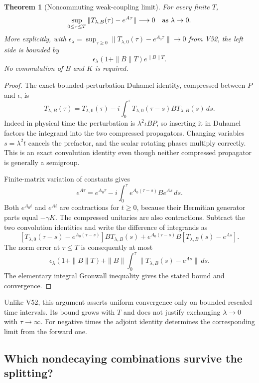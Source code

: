 \documentclass[11pt]{article}
\newtheorem{theorem}{Theorem}[section]
\theoremstyle{remark}
\begin{document}
\begin{theorem}[Noncommuting weak-coupling limit]
\label{thm:v20v53-limit}
For every finite \(T\),
\[
 \sup_{0\leq\tau\leq T}\|T_{\lambda,B}(\tau)-e^{A\tau}\|
       \longrightarrow0\quad\hbox{as }\lambda\to0.
\]
More explicitly, with
\(\epsilon_\lambda=\sup_{\tau\geq0}
 \|T_{\lambda,0}(\tau)-e^{A_0\tau}\|\to0\) from V52,
the left side is bounded by
\[
 \epsilon_\lambda(1+\|B\|T)e^{\|B\|T}.
\]
No commutation of \(B\) and \(K\) is required.
\end{theorem}
\begin{proof}
The exact bounded-perturbation Duhamel identity, compressed
between \(P\) and \(\iota\), is
\[
 T_{\lambda,B}(\tau)=T_{\lambda,0}(\tau)
 -i\int_0^\tau T_{\lambda,0}(\tau-s)B
                          T_{\lambda,B}(s)\,ds .
\]
Indeed in physical time the perturbation is
\(\lambda^2\iota BP\), so inserting it in Duhamel factors
the integrand into the two compressed propagators.
Changing variables \(s=\lambda^2t\) cancels the prefactor,
and the scalar rotating phases multiply correctly.
This is an exact convolution identity even though neither
compressed propagator is generally a semigroup.

Finite-matrix variation of constants gives
\[
 e^{A\tau}=e^{A_0\tau}
 -i\int_0^\tau e^{A_0(\tau-s)}B e^{As}\,ds .
\]
Both \(e^{A_0t}\) and \(e^{At}\) are contractions for \(t\geq0\),
because their Hermitian generator parts equal \(-\gamma K\).
The compressed unitaries are also contractions.  Subtract the
two convolution identities and write the difference of integrands as
\[
 [T_{\lambda,0}(\tau-s)-e^{A_0(\tau-s)}]B T_{\lambda,B}(s)
 + e^{A_0(\tau-s)}B[T_{\lambda,B}(s)-e^{As}].
\]
The norm error at \(\tau\leq T\) is consequently at most
\[
 \epsilon_\lambda(1+\|B\|T)
       +\|B\|\int_0^\tau
                    \|T_{\lambda,B}(s)-e^{As}\|\,ds .
\]
The elementary integral Gronwall inequality gives the stated
bound and convergence.
\end{proof}

Unlike V52, this argument asserts uniform convergence only on
bounded rescaled time intervals.  Its bound grows with \(T\)
and does not justify exchanging \(\lambda\to0\) with
\(\tau\to\infty\).  For negative times the adjoint identity
determines the corresponding limit from the forward one.

\subsection{Which nondecaying combinations survive the splitting?}
\end{document}
